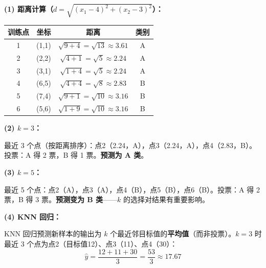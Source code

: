 \documentclass[a4paper,11pt]{ctexart}
\begin{document}
\begin{solutionbox}[参考答案与详细解析]
    \textbf{(1) 距离计算（$d = \sqrt{(x_1-4)^2+(x_2-3)^2}$）：}

    \begin{center}
    \begin{tabular}{cccc}
        \toprule
        训练点 & 坐标 & 距离 & 类别 \\
        \midrule
        1 & (1,1) & $\sqrt{9+4}=\sqrt{13}\approx3.61$ & A \\
        2 & (2,2) & $\sqrt{4+1}=\sqrt{5}\approx2.24$ & A \\
        3 & (3,1) & $\sqrt{1+4}=\sqrt{5}\approx2.24$ & A \\
        4 & (6,5) & $\sqrt{4+4}=\sqrt{8}\approx2.83$ & B \\
        5 & (7,4) & $\sqrt{9+1}=\sqrt{10}\approx3.16$ & B \\
        6 & (5,6) & $\sqrt{1+9}=\sqrt{10}\approx3.16$ & B \\
        \bottomrule
    \end{tabular}
    \end{center}

    \textbf{(2) $k=3$：}

    最近 3 个点（按距离排序）：点2（2.24，A），点3（2.24，A），点4（2.83，B）。投票：A 得 2 票，B 得 1 票。\textbf{预测为 A 类}。

    \textbf{(3) $k=5$：}

    最近 5 个点：点2（A），点3（A），点4（B），点5（B），点6（B）。投票：A 得 2 票，B 得 3 票。\textbf{预测变为 B 类}——$k$ 的选择对结果有重要影响。

    \textbf{(4) KNN 回归：}

    KNN 回归预测新样本的输出为 $k$ 个最近邻目标值的\textbf{平均值}（而非投票）。$k=3$ 时最近 3 个点为点2（目标值12）、点3（11）、点4（30）：
    \[
    \hat{y} = \frac{12+11+30}{3} = \frac{53}{3} \approx \mathbf{17.67}
    \]
\end{solutionbox}
\end{document}
